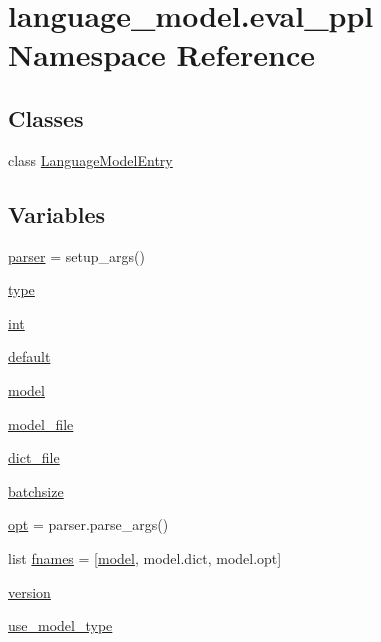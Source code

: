 \hypertarget{namespacelanguage__model_1_1eval__ppl}{}\section{language\+\_\+model.\+eval\+\_\+ppl Namespace Reference}
\label{namespacelanguage__model_1_1eval__ppl}
\subsection*{Classes}
\begin{DoxyCompactItemize}
\item 
class \hyperlink{classlanguage__model_1_1eval__ppl_1_1LanguageModelEntry}{Language\+Model\+Entry}
\end{DoxyCompactItemize}
\subsection*{Variables}
\begin{DoxyCompactItemize}
\item 
\hyperlink{namespacelanguage__model_1_1eval__ppl_a45981ffc7b8bc90dfc7b6174d7461e8e}{parser} = setup\+\_\+args()
\item 
\hyperlink{namespacelanguage__model_1_1eval__ppl_a750e75a8688a4996ea96948e7e5150ba}{type}
\item 
\hyperlink{namespacelanguage__model_1_1eval__ppl_a7d12ee00479673c5c8d1f6d01faa272a}{int}
\item 
\hyperlink{namespacelanguage__model_1_1eval__ppl_a4bd739c0bc1c2a44ca004da00b00929c}{default}
\item 
\hyperlink{namespacelanguage__model_1_1eval__ppl_a283085c6267a716efda2fdad3ba4dd38}{model}
\item 
\hyperlink{namespacelanguage__model_1_1eval__ppl_a459da03ba3f83d46f8f820358043631a}{model\+\_\+file}
\item 
\hyperlink{namespacelanguage__model_1_1eval__ppl_ae8868751bf6404555342613dbea84517}{dict\+\_\+file}
\item 
\hyperlink{namespacelanguage__model_1_1eval__ppl_ac8bcf54cc64d6316f9119c107871f693}{batchsize}
\item 
\hyperlink{namespacelanguage__model_1_1eval__ppl_aba3c9374ac5406ca41a085d79c769163}{opt} = parser.\+parse\+\_\+args()
\item 
list \hyperlink{namespacelanguage__model_1_1eval__ppl_a4adddf3dd3ba1ee5de3898a99b2fd7e7}{fnames} = \mbox{[}\textquotesingle{}\hyperlink{namespacelanguage__model_1_1eval__ppl_a283085c6267a716efda2fdad3ba4dd38}{model}\textquotesingle{}, \textquotesingle{}model.\+dict\textquotesingle{}, \textquotesingle{}model.\+opt\textquotesingle{}\mbox{]}
\item 
\hyperlink{namespacelanguage__model_1_1eval__ppl_a8cb118eb13e859eb0a79b875ac7859cb}{version}
\item 
\hyperlink{namespacelanguage__model_1_1eval__ppl_a7a4b59869d10fb09cb2ff82597082841}{use\+\_\+model\+\_\+type}
\end{DoxyCompactItemize}


